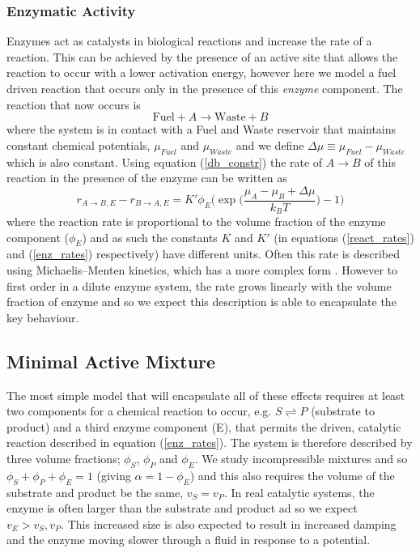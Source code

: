 \subsubsection{Enzymatic Activity}
Enzymes act as catalysts in biological reactions and increase the rate of a reaction. This can be achieved by the presence of an active site that allows the reaction to occur with a lower activation energy, however here we model a fuel driven reaction that occurs only in the presence of this \textit{enzyme} component. The reaction that now occurs is
\begin{equation}
    \text{Fuel} + A \rightarrow \text{Waste} + B
\end{equation}
where the system is in contact with a Fuel and Waste reservoir that maintains constant chemical potentials, $\mu_{Fuel}$ and $\mu_{Waste}$ and we define $\Delta\mu \equiv \mu_{Fuel}-\mu_{Waste}$ which is also constant. Using equation (\ref{db_constr}) the rate of $A \rightarrow B$ of this reaction in the presence of the enzyme can be written as
\begin{equation}
    r_{A \rightarrow B,E} - r_{B \rightarrow A,E} = K'\phi_E\Bigg(\exp\bigg(\frac{\mu_A - \mu_B + \Delta\mu}{k_B T}\bigg)-1\Bigg)
    \label{enz_rates}
\end{equation}
where the reaction rate is proportional to the volume fraction of the enzyme component ($\phi_E$) and as such the constants $K$ and $K'$ (in equations (\ref{react_rates}) and (\ref{enz_rates}) respectively) have different units. Often this rate is described using Michaelis–Menten kinetics, which has a more complex form \cite{murray_mathematical_1993}. However to first order in a dilute enzyme system, the rate grows linearly with the volume fraction of enzyme and so we expect this description is able to encapsulate the key behaviour.

\subsection{\label{sec:min_mix}Minimal Active Mixture}

The most simple model that will encapsulate all of these effects requires at least two components for a chemical reaction to occur, e.g. $S \rightleftharpoons P$ (substrate to product) and a third enzyme component (E), that permits the driven, catalytic reaction described in equation (\ref{enz_rates}). The system is therefore described by three volume fractions; $\phi_S$, $\phi_P$ and $\phi_E$. We study incompressible mixtures and so $\phi_S+\phi_P+\phi_E=1$ (giving $\alpha=1-\phi_E$) and this also requires the volume of the substrate and product be the same, $v_S=v_P$. In real catalytic systems, the enzyme is often larger than the substrate and product ad so we expect $v_E > v_S, v_P$\cite{berg_biochemistry_2002}. This increased size is also expected to result in increased damping and the enzyme moving slower through a fluid in response to a potential.

